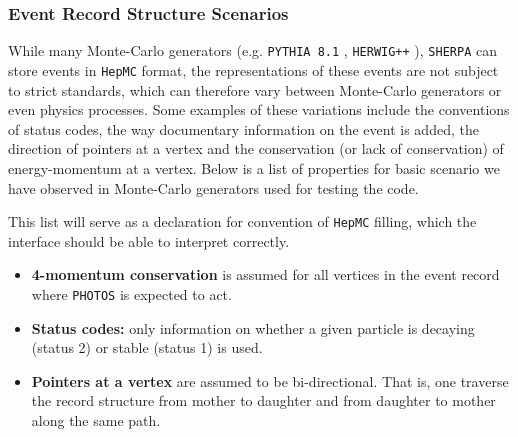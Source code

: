 \documentclass[]{Photos_interface_design}
\begin{document}
\subsubsection{Event Record Structure Scenarios}



While many Monte-Carlo generators (e.g. {\tt PYTHIA 8.1} \cite{Sjostrand:2007gs}, 
{\tt HERWIG++} \cite{Bahr:2008pv}), {\tt SHERPA} \cite{Gleisberg:2008ta} can 
store events in {\tt HepMC} format, the  representations of
these events are not subject to strict standards,  which can therefore
vary between Monte-Carlo generators or even physics processes. Some examples
of these variations include the conventions of status codes, the  way
documentary information on the event is added, the direction of pointers at a vertex
and the conservation (or lack of conservation) of energy-momentum at a vertex.
Below is a list of properties for basic scenario we have observed in Monte-Carlo
generators used for testing the code.

This list will serve as a declaration for convention of  {\tt HepMC} filling, which  the 
interface should  be able to interpret correctly.

\begin{itemize}
  \item \textbf{4-momentum conservation} is assumed for all vertices in the event record where {\tt PHOTOS} is expected to act.
  \item \textbf{Status codes:} only information on whether a given particle is decaying (status 2) or stable (status 1) is used.
  \item \textbf{Pointers at a vertex} are assumed to be bi-directional. 
    That is, one  traverse the record structure from mother to daughter 
    and from daughter to mother along the same path.
\end{itemize}
\end{document}
